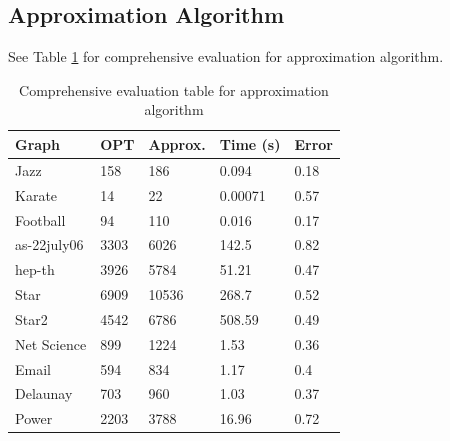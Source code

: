 \subsection{Approximation Algorithm}
See Table \ref{tab1} for comprehensive evaluation for approximation algorithm.
\begin{table}[htb]
\caption{Comprehensive evaluation table for approximation algorithm}
\label{tab1}
\begin{minipage}{\columnwidth}
\begin{center}
\begin{tabular}{@{}lllll@{}}
\toprule
Graph        & OPT  & Approx. & Time (s) & Error \\ \midrule
Jazz         & 158  & 186     & 0.094    & 0.18  \\
Karate       & 14   & 22      & 0.00071  & 0.57  \\
Football     & 94   & 110     & 0.016    & 0.17  \\
as-22july06 & 3303 & 6026    & 142.5    & 0.82  \\
hep-th       & 3926 & 5784    & 51.21    & 0.47  \\
Star         & 6909 & 10536   & 268.7    & 0.52  \\
Star2        & 4542 & 6786    & 508.59   & 0.49  \\
Net Science  & 899  & 1224    & 1.53     & 0.36  \\
Email        & 594  & 834     & 1.17     & 0.4   \\
Delaunay     & 703  & 960     & 1.03     & 0.37  \\
Power        & 2203 & 3788    & 16.96    & 0.72  \\ \bottomrule
\end{tabular}
\end{center}
\end{minipage}
\end{table}

